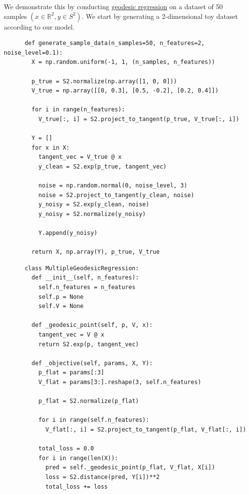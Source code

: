   \begin{example}
    \label{ex:code-walkthrough-2}
    We demonstrate this by conducting \hyperref[def:geodesic-regression]{geodesic regression} on a dataset of 50 samples $(x \in \mathbb{R}^2, y \in S^2)$. We start by generating a 2-dimensional toy dataset according to our model. 

    \begin{lstlisting}
      def generate_sample_data(n_samples=50, n_features=2, noise_level=0.1):
        X = np.random.uniform(-1, 1, (n_samples, n_features))
        
        p_true = S2.normalize(np.array([1, 0, 0]))
        V_true = np.array([[0, 0.3], [0.5, -0.2], [0.2, 0.4]])
        
        for i in range(n_features):
          V_true[:, i] = S2.project_to_tangent(p_true, V_true[:, i])
        
        Y = []
        for x in X:
          tangent_vec = V_true @ x
          y_clean = S2.exp(p_true, tangent_vec)
          
          noise = np.random.normal(0, noise_level, 3)
          noise = S2.project_to_tangent(y_clean, noise)
          y_noisy = S2.exp(y_clean, noise)
          y_noisy = S2.normalize(y_noisy)
          
          Y.append(y_noisy)
        
        return X, np.array(Y), p_true, V_true
    \end{lstlisting}

    \begin{lstlisting}
      class MultipleGeodesicRegression:
        def __init__(self, n_features):
          self.n_features = n_features
          self.p = None
          self.V = None
        
        def _geodesic_point(self, p, V, x):
          tangent_vec = V @ x
          return S2.exp(p, tangent_vec)
        
        def _objective(self, params, X, Y):
          p_flat = params[:3]
          V_flat = params[3:].reshape(3, self.n_features)
          
          p_flat = S2.normalize(p_flat)
          
          for i in range(self.n_features):
            V_flat[:, i] = S2.project_to_tangent(p_flat, V_flat[:, i])
          
          total_loss = 0.0
          for i in range(len(X)):
            pred = self._geodesic_point(p_flat, V_flat, X[i])
            loss = S2.distance(pred, Y[i])**2
            total_loss += loss
          

\end{lstlisting}
\end{example}
